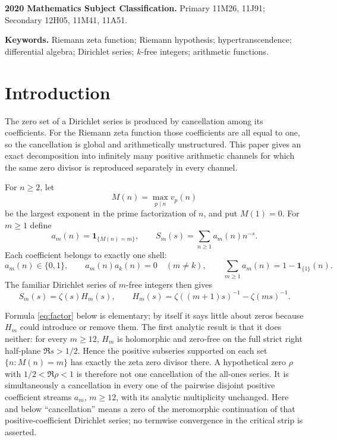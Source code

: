 \documentclass[11pt]{article}
\theoremstyle{definition}
\theoremstyle{remark}
\begin{document}
\medskip
\noindent\textbf{2020 Mathematics Subject Classification.}
Primary 11M26, 11J91; Secondary 12H05, 11M41, 11A51.

\noindent\textbf{Keywords.}
Riemann zeta function; Riemann hypothesis; hypertranscendence; differential algebra;
Dirichlet series; \(k\)-free integers; arithmetic functions.

\section{Introduction}\label{sec:intro}

The zero set of a Dirichlet series is produced by cancellation among its coefficients.  For the
Riemann zeta function those coefficients are all equal to one, so the cancellation is global
and arithmetically unstructured.  This paper gives an exact decomposition into infinitely many
positive arithmetic channels for which the same zero divisor is reproduced separately in every
channel.

For \(n\geq2\), let
\[
 M(n)=\max_{p\mid n}v_p(n)
\]
be the largest exponent in the prime factorization of \(n\), and put \(M(1)=0\).  For \(m\geq1\)
define
\[
 a_m(n)=\mathbf 1_{\{M(n)=m\}},
 \qquad
 S_m(s)=\sum_{n\geq1}a_m(n)n^{-s}.
 \tag{1.1}
\]
Each coefficient belongs to exactly one shell:
\[
 a_m(n)\in\{0,1\},\qquad
 a_m(n)a_k(n)=0\quad(m\ne k),\qquad
 \sum_{m\geq1}a_m(n)=1-\mathbf 1_{\{1\}}(n).
 \tag{1.2}
\]
The familiar Dirichlet series of \(m\)-free integers then gives
\[
 S_m(s)=\zeta(s)H_m(s),\qquad
 H_m(s)=\zeta((m+1)s)^{-1}-\zeta(ms)^{-1}.
 \tag{1.3}
\]

Formula \eqref{eq:factor} below is elementary; by itself it says little about zeros because
\(H_m\) could introduce or remove them.  The first analytic result is that it does neither:
for every \(m\geq12\), \(H_m\) is holomorphic and zero-free on the full strict right half-plane
\(\Re s>1/2\).  Hence the positive subseries supported on each set
\(\{n:M(n)=m\}\) has exactly the zeta zero divisor there.  A hypothetical zero
\(\rho\) with \(1/2<\Re\rho<1\) is therefore not one cancellation of the all-ones series.  It is
simultaneously a cancellation in every one of the pairwise disjoint positive coefficient
streams \(a_m\), \(m\geq12\), with its analytic multiplicity unchanged.  Here and below
``cancellation'' means a zero of the meromorphic continuation of that positive-coefficient
Dirichlet series; no termwise convergence in the critical strip is asserted.
\end{document}

